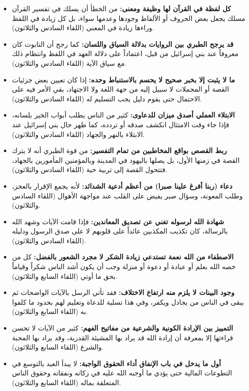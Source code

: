 \begin{itemize}
    \item \textbf{كل لفظة في القرآن لها وظيفة ومعنى:} من الخطأ أن يسلك في تفسير القرآن مسلك يجعل بعض الحروف أو الألفاظ وجودها وعدمها سواء، بل كل زيادة في اللفظ وراءها زيادة في المعنى (اللقاء السادس والثلاثون).
    \item \textbf{قد يرجح الطبري بين الروايات بدلالة السياق واللسان:} كما رجح أن التابوت كان معروفاً عند بني إسرائيل من قبل، اعتماداً على دلالة العهد في اللفظ وانتظام ذلك مع سياق الآية (اللقاء السادس والثلاثون).
    \item \textbf{ما لا يثبت إلا بخبر صحيح لا يحسم بالاستنباط وحده:} إذا كان تعيين بعض جزئيات القصة أو المجملات لا سبيل إليه من جهة اللغة ولا الاجتهاد، بقي الأمر فيه على الاحتمال حتى يقوم دليل يجب التسليم له (اللقاء السادس والثلاثون).
    \item \textbf{الابتلاء العملي أصدق ميزان للدعاوى:} كثير من الناس يطلب أبواب الخير بلسانه، فإذا جاء وقت الامتثال انكشف صدقه أو تردده، كما ظهر حال بني إسرائيل عند الابتلاء بالنهر والجهاد (اللقاء السادس والثلاثون).
    \item \textbf{ربط القصص بواقع المخاطبين من تمام التفسير:} من قوة الطبري أنه لا يترك القصة في زمنها الأول، بل يصلها باليهود في المدينة وبالمؤمنين المأمورين بالجهاد، فتتحول القصة إلى تربية حية (اللقاء السادس والثلاثون).
    \item \textbf{دعاء (ربنا أفرغ علينا صبرا) من أعظم أدعية الشدائد:} لأنه يجمع الإقرار بالعجز، وطلب المعونة، وسؤال صبر يفيض على القلب عند مواجهة الأهوال (اللقاء السادس والثلاثون).
    \item \textbf{شهادة الله لرسوله تغني عن تصديق المعاندين:} فإذا قامت الآيات وشهد الله بالرسالة، كان تكذيب المكذبين عائداً على قلوبهم لا على صدق الرسول ودليله (اللقاء السادس والثلاثون).
    \item \textbf{الاصطفاء من الله نعمة تستدعي زيادة الشكر لا مجرد الشعور بالفضل:} كل من خصه الله بعلم أو عبادة أو دعوة أو منزلة وجب أن يكون أشد الناس شكراً وقياماً بحق ما أوتي (اللقاء السابع والثلاثون).
    \item \textbf{وجود البينات لا يلزم منه ارتفاع الاختلاف:} فقد تأتي الرسل بالآيات الواضحات ثم يبقى في الناس من يجادل ويكفر، وفي هذا تسلية للدعاة وتعليم لهم بحدود ما كلفوا به (اللقاء السابع والثلاثون).
    \item \textbf{التمييز بين الإرادة الكونية والشرعية من مفاتيح الفهم:} كثير من الآيات لا تحسن قراءتها إلا بمعرفة أن إرادة الله قد يراد بها المشيئة القدرية، وقد يراد بها المحبة والشرع (اللقاء السابع والثلاثون).
    \item \textbf{أول ما يدخل في باب الإنفاق أداء الحقوق الواجبة:} لا يبدأ العبد بالتوسع في التطوعات المالية حتى يؤدي ما أوجبه الله عليه في زكاته ونفقاته وحقوق الناس المتعلقة بماله (اللقاء السابع والثلاثون).

\end{itemize}
